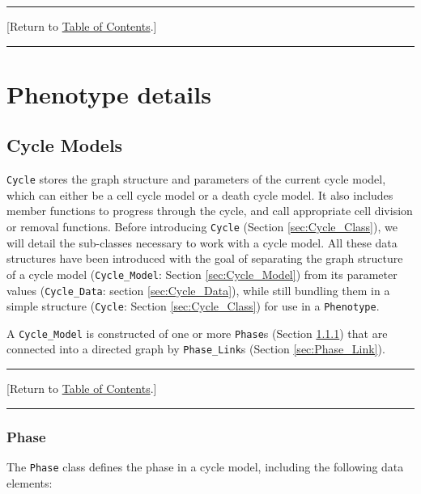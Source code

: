 \documentclass[12pt]{article}
\renewcommand{\v}{\verb}
\newcommand{\blue}[1]{\textcolor{blue}{#1}}
\newcommand{\DONE}{}%
\newcommand{\TOClink}{\begin{center}\hrule\vskip-5pt\phantom{.}\hfill[Return to \hyperlink{TOC}{Table of Contents}.]\hfill\phantom{.}\vskip3pt\hrule\end{center}}
\begin{document}
\TOClink 

\section{Phenotype details}
\label{sec:phenotype_details}


\subsection{Cycle Models\DONE}
\label{sec:Cycle}
\v|Cycle| stores the graph structure and parameters of the current cycle model, which can either be a 
cell cycle model or a death cycle model. It also includes member functions to progress through the 
cycle, and call appropriate cell division or removal functions. Before introducing 
\v|Cycle| (Section \ref{sec:Cycle_Class}), we will detail the sub-classes necessary to work with a cycle model. All these 
data structures have been introduced with the goal of separating the graph structure of a 
cycle model (\v|Cycle_Model|: Section \ref{sec:Cycle_Model}) from its parameter values (\v|Cycle_Data|: section \ref{sec:Cycle_Data}), while still bundling 
them in a simple structure (\v|Cycle|: Section \ref{sec:Cycle_Class}) 
for use in a \v|Phenotype|. 

A \v|Cycle_Model| is constructed of one or more 
\v|Phase|s (Section \ref{sec:Phase}) that are connected into a 
directed graph by \v|Phase_Link|s (Section \ref{sec:Phase_Link}). 

\TOClink 

\subsubsection{Phase \DONE}
\label{sec:Phase}
The \v|Phase| class defines the phase in a cycle model, including the following data elements:
\end{document}
